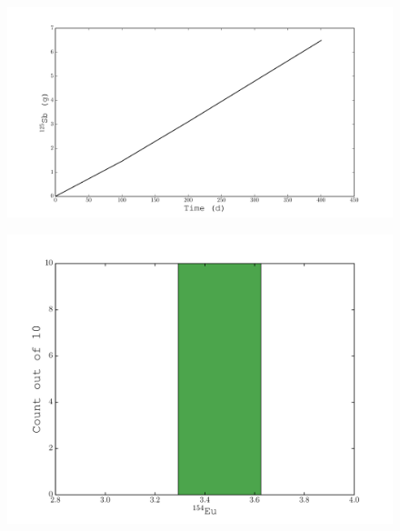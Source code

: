\documentclass{beamer}
\begin{document}
\begin{frame}
    \begin{figure}[H]
    \begin{center}
      \includegraphics[width=0.77\columnwidth]{../Origen2/PLOTS/SB125Post_XY.pdf}
      \vspace{-5mm}
      \label{fig:POSTXYSb125}
    \end{center}
  \end{figure}
\end{frame}
    
\begin{frame}
  \begin{figure}[H]
    \begin{center}
      \includegraphics[width=0.77\columnwidth]{../Origen2/PLOTS/EU154Post_HIST.pdf}
      \vspace{-5mm}
      \label{fig:POSTHISTEu154}
    \end{center}
  \end{figure}
\end{frame}
  
\end{document}
